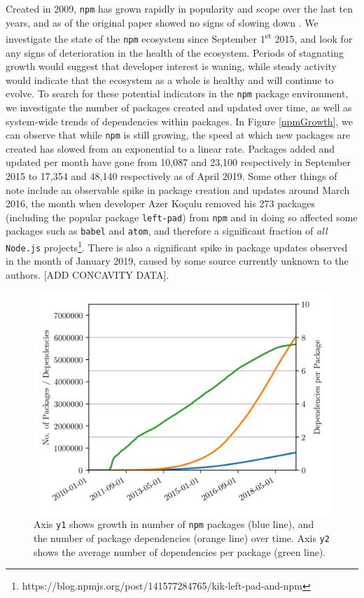 \documentclass[10pt,conference]{IEEEtran}
\def\code#1{\texttt{#1}}
\begin{document}
Created in 2009, \code{npm} has grown
rapidly in popularity and scope over the last ten years, and 
as of the original paper showed no signs of slowing down \cite{Wittern:2016}.
We investigate the state of the \code{npm} ecosystem
since September 1\textsuperscript{st} 2015, and look for any signs of deterioration in 
the health of the ecosystem. Periods of stagnating growth would suggest
that developer interest is waning, while steady activity would 
indicate that the ecosystem as a whole is healthy and will continue to
evolve. To search for these potential indicators in the \code{npm} package environment,
we investigate the number of packages created and updated over time, as well
as system-wide trends of dependencies within packages. 
In Figure \ref{npmGrowth},
we can observe that while \code{npm} is still growing, the speed at which new packages
are created has slowed from an exponential to a linear rate. Packages added and updated 
per month have gone from 10,087 and 23,100 respectively in September 2015 to 17,354 and 48,140 respectively as of April 2019.
Some other things of note include an observable spike in package creation and updates around March 2016, the month 
when developer Azer Ko\c{c}ulu removed his 273 packages (including the popular package 
\code{left-pad}) from \code{npm} and in doing so affected some packages such as 
\code{babel} and \code{atom}, and therefore a significant fraction of \emph{all} 
\code{Node.js} projects\footnote{https://blog.npmjs.org/post/141577284765/kik-left-pad-and-npm}.
There is also a significant spike in package updates observed in the month of January 2019, caused 
by some source currently unknown to the authors.
[ADD CONCAVITY DATA]. 

\begin{figure}
  \includegraphics[width=1\linewidth]{figures/packages_vs_dependencies.png}
  \caption{Axis \code{y1} shows growth in number of \code{npm} packages (blue line), and the number of package dependencies (orange line) over time. 
  Axis \code{y2} shows the average number of dependencies per package (green line).}
  \label{packVSDependencies}
\end{figure}
\end{document}
